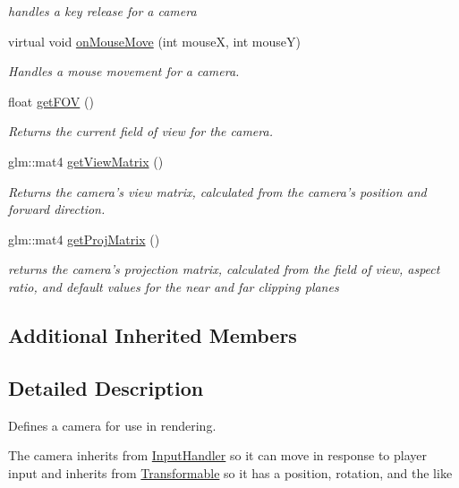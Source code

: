 \begin{DoxyCompactItemize}
\begin{DoxyCompactList}\small\item\em handles a key release for a camera \end{DoxyCompactList}\item 
virtual void \hyperlink{class_camera_ab2a7799db840c22322ab06ef968e4f3e}{on\-Mouse\-Move} (int mouse\-X, int mouse\-Y)
\begin{DoxyCompactList}\small\item\em Handles a mouse movement for a camera. \end{DoxyCompactList}\item 
float \hyperlink{class_camera_a5ec1871e6f296d8528e64157c6371c09}{get\-F\-O\-V} ()
\begin{DoxyCompactList}\small\item\em Returns the current field of view for the camera. \end{DoxyCompactList}\item 
glm\-::mat4 \hyperlink{class_camera_a5569ca5967e01d3344fbf6aba36d9820}{get\-View\-Matrix} ()
\begin{DoxyCompactList}\small\item\em Returns the camera's view matrix, calculated from the camera's position and forward direction. \end{DoxyCompactList}\item 
glm\-::mat4 \hyperlink{class_camera_a4e4f082071bdf7da528ecf19e09f938d}{get\-Proj\-Matrix} ()
\begin{DoxyCompactList}\small\item\em returns the camera's projection matrix, calculated from the field of view, aspect ratio, and default values for the near and far clipping planes \end{DoxyCompactList}\end{DoxyCompactItemize}
\subsection*{Additional Inherited Members}


\subsection{Detailed Description}
Defines a camera for use in rendering. 

The camera inherits from \hyperlink{class_input_handler}{Input\-Handler} so it can move in response to player input and inherits from \hyperlink{class_transformable}{Transformable} so it has a position, rotation, and the like 

